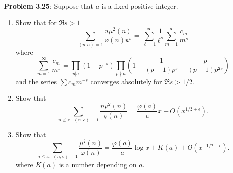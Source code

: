 \documentclass[12pt]{article}
\begin{document}
\fi

\textbf{Problem 3.25}: Suppose that $a$ is a fixed positive integer.
\begin{enumerate}
\item Show that for $\Re s > 1$
$$\sum_{(n, a) = 1} \frac{n \mu^2(n)}{\varphi(n) n^s} = \sum_{\ell = 1}^\infty \frac{1}{\ell^s} \sum_{m = 1}^\infty \frac{c_m}{m^s}$$
where
$$\sum_{m = 1}^\infty \frac{c_m}{m^s} = \prod_{p | a} (1 - p^{-s}) \prod_{p \nmid a} \left( 1 + \frac{1}{(p-1)p^s} - \frac{p}{(p-1)p^{2s}}\right)$$
and the series $\sum c_m m^{-s}$ converges absolutely for $\Re s > 1/2$.

\item Show that
$$\sum_{n \leq x, \; (n, a) = 1} \frac{n \mu^2(n)}{\phi(n)} = \frac{\varphi(a)}{a} x + O(x^{1/2 + \epsilon}).$$

\item Show that
$$\sum_{n \leq x, \; (n, a) = 1} \frac{\mu^2(n)}{\varphi(n)} = \frac{\varphi(a)}{a} \log x + K(a) + O(x^{-1/2 + \epsilon}).$$
where $K(a)$ is a number depending on $a$.
\end{enumerate}
\end{document}
